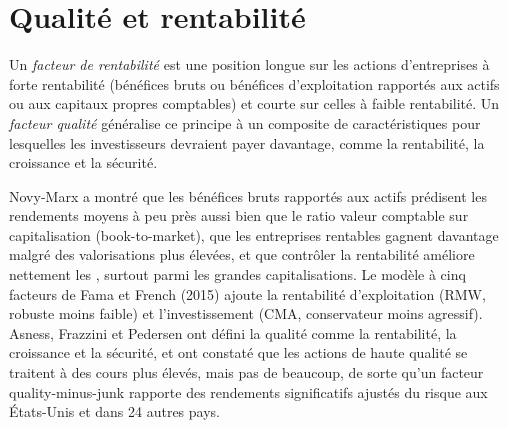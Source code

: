 \begin{omfigure}

\label{fig:s1:value-quality-and-low-risk:rolling}
\end{omfigure}

\section{Qualité et rentabilité}

\begin{definition}\label{def:s1:value-quality-and-low-risk:quality}
Un \emph{facteur de rentabilité} est une position longue sur les actions d'entreprises à forte rentabilité (bénéfices bruts ou bénéfices d'exploitation rapportés aux actifs ou
aux capitaux propres comptables) et courte sur celles à faible rentabilité. Un \emph{facteur qualité} généralise ce principe à un composite de caractéristiques pour lesquelles les investisseurs
devraient payer davantage, comme la rentabilité, la croissance et la sécurité.
\end{definition}

Novy-Marx a montré que les bénéfices bruts rapportés aux actifs prédisent les rendements moyens à peu près aussi bien que le ratio valeur comptable sur capitalisation (book-to-market), que les entreprises rentables gagnent davantage malgré des
valorisations plus élevées, et que contrôler la rentabilité améliore nettement les , surtout parmi les grandes capitalisations. Le modèle à cinq facteurs de Fama et French
(2015) ajoute la rentabilité d'exploitation (RMW, robuste moins faible) et l'investissement (CMA, conservateur moins agressif). Asness, Frazzini et Pedersen ont défini
la qualité comme la rentabilité, la croissance et la sécurité, et ont constaté que les actions de haute qualité se traitent à des cours plus élevés, mais pas de beaucoup, de sorte qu'un facteur quality-minus-junk
rapporte des rendements significatifs ajustés du risque aux États-Unis et dans 24 autres pays.

